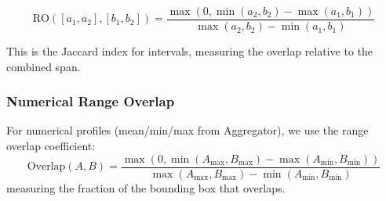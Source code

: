\begin{equation}
	\text{RO}([a_1, a_2], [b_1, b_2]) = \frac{\max(0, \min(a_2, b_2) - \max(a_1, b_1))}{\max(a_2, b_2) - \min(a_1, b_1)}
\end{equation}

This is the Jaccard index for intervals, measuring the overlap relative to the combined span.
\subsubsection{Numerical Range Overlap}
\label{sec:num_range_overlap}

For numerical profiles (mean/min/max from Aggregator), we use the range overlap coefficient:
\begin{equation}
	\text{Overlap}(A,B) = \frac{\max(0, \min(A_{\max}, B_{\max}) - \max(A_{\min}, B_{\min}))}{\max(A_{\max}, B_{\max}) - \min(A_{\min}, B_{\min})}
\end{equation}
measuring the fraction of the bounding box that overlaps.





